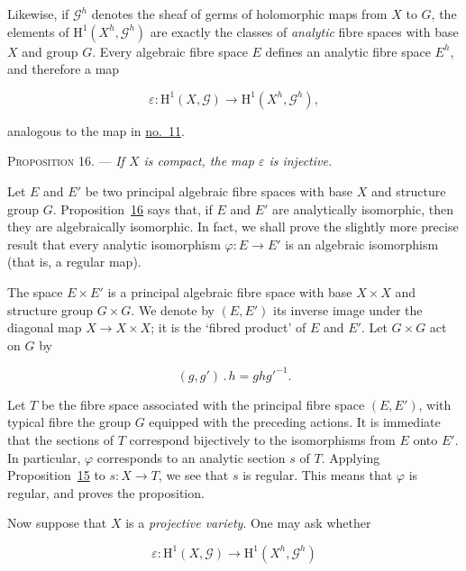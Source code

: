Likewise, if $\mathcal{G}^h$ denotes the sheaf of germs of holomorphic maps
from $X$ to $G$, the elements of
$\mathrm{H}^1(X^h,\mathcal{G}^h)$ are exactly the classes of \emph{analytic}
fibre spaces with base $X$ and group $G$. Every algebraic fibre space $E$
defines an analytic fibre space $E^h$, and therefore a map

\begin{equation*}
\varepsilon:\mathrm{H}^1(X,\mathcal{G})
\longrightarrow\mathrm{H}^1(X^h,\mathcal{G}^h),
\end{equation*}

analogous to the map in \hyperref[gaga:no:11]{no.~11}.

\textsc{Proposition 16}. --- \emph{If $X$ is
compact, the map $\varepsilon$ is injective.}

Let $E$ and $E'$ be two principal algebraic fibre spaces with base $X$ and
structure group $G$. Proposition~\hyperref[gaga:prop:16]{16} says that, if
$E$ and $E'$ are analytically isomorphic, then they are algebraically
isomorphic. In fact, we shall prove the slightly more precise result that
every analytic isomorphism $\varphi:E\to E'$ is an algebraic isomorphism
(that is, a regular map).

The space $E\times E'$ is a principal algebraic fibre space with base
$X\times X$ and structure group $G\times G$. We denote by $(E,E')$ its
inverse image under the diagonal map $X\to X\times X$; it is the `fibred
product' of $E$ and $E'$. Let $G\times G$ act on $G$ by

\begin{equation*}
(g,g')\mathbin{.}h=gh{g'}^{-1}.
\end{equation*}

Let $T$ be the fibre space associated with the principal fibre space
$(E,E')$, with typical fibre the group $G$ equipped with the preceding
actions. It is immediate that the sections of $T$ correspond bijectively to
the isomorphisms from $E$ onto $E'$. In particular, $\varphi$ corresponds to
an analytic section $s$ of $T$. Applying Proposition~\hyperref[gaga:prop:15]{15}
to $s:X\to T$, we see that $s$ is regular. This means that $\varphi$ is
regular, and proves the proposition.

Now suppose that $X$ is a \emph{projective variety}. One may ask whether

\begin{equation*}
\varepsilon:\mathrm{H}^1(X,\mathcal{G})
\longrightarrow\mathrm{H}^1(X^h,\mathcal{G}^h)
\end{equation*}

